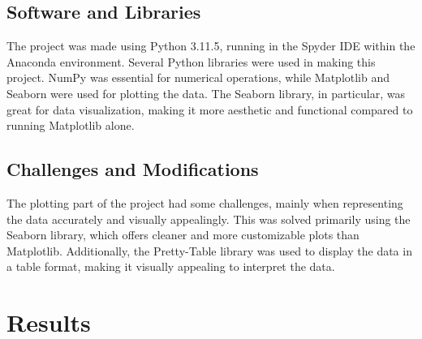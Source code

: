 \documentclass{llncs}
\numberwithin{figure}{section}
\begin{document}
\subsection{Software and Libraries}
The project was made using Python 3.11.5, running in the Spyder IDE within the Anaconda environment. Several Python libraries were used in making this project. NumPy was essential for numerical operations, while Matplotlib and Seaborn were used for plotting the data. The Seaborn library, in particular, was great for data visualization, making it more aesthetic and functional compared to running Matplotlib alone.
\vspace{2em}
\subsection{Challenges and Modifications}
The plotting part of the project had some challenges, mainly when representing the data accurately and visually appealingly. This was solved primarily using the Seaborn library, which offers cleaner and more customizable plots than Matplotlib. Additionally, the Pretty-Table library was used to display the data in a table format, making it visually appealing to interpret the data.

\newpage
\section{Results}
\end{document}
